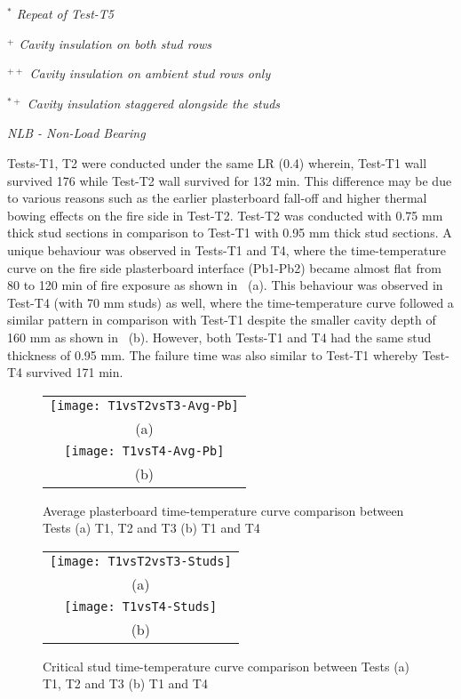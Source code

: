 \begin{sidewaystable}[!htbp]
\begin{threeparttable}
\begin{center}
\begin{tablenotes}
						\small
						\item \textit{\(^*\) Repeat of Test-T5}
						\item \textit{\(^+\) Cavity insulation on both stud rows}
						\item \textit{\(^{++}\) Cavity insulation on ambient stud rows only}
						\item \textit{\(^{*+}\) Cavity insulation staggered alongside the studs}
						\item \textit{NLB - Non-Load Bearing}
					\end{tablenotes}
		\end{center}
	\end{threeparttable}
\end{sidewaystable}%

Tests-T1, T2 were conducted under the same LR (0.4) wherein, Test-T1 wall survived 176 while Test-T2 wall survived for 132 min. This difference may be due to various reasons such as the earlier plasterboard fall-off and higher thermal bowing effects on the fire side in Test-T2. Test-T2 was conducted with 0.75 mm thick stud sections in comparison to Test-T1 with 0.95 mm thick stud sections. A unique behaviour was observed in Tests-T1 and T4, where the time-temperature curve on the fire side plasterboard interface (Pb1-Pb2) became almost flat from 80 to 120 min of fire exposure as shown in ~(a). This behaviour was observed in Test-T4 (with 70 mm studs) as well, where the time-temperature curve followed a similar pattern in comparison with Test-T1 despite the smaller cavity depth of 160 mm as shown in ~(b). However, both Tests-T1 and T4 had the same stud thickness of 0.95 mm. The failure time was also similar to Test-T1 whereby Test-T4 survived 171 min. 
\begin{figure}[!htbp]
	\centering
		\begin{tabular}{c}
			\texttt{[image: T1vsT2vsT3-Avg-Pb]} \\
			(a) \\
			 \texttt{[image: T1vsT4-Avg-Pb]} \\ 
			 (b) \\ 
		\end{tabular} 
		\caption{Average plasterboard time-temperature curve comparison between Tests (a) T1, T2 and T3 (b) T1 and T4}
		\label{fig:T1vsT2vsT3vsT4-Avg-Pb}
\end{figure}
\begin{figure}[!htbp]
	\centering
		\begin{tabular}{c}
			\texttt{[image: T1vsT2vsT3-Studs]} \\
			(a) \\ 
			\texttt{[image: T1vsT4-Studs]} \\ 
			(b) \\ 
		\end{tabular} 
		\caption{Critical stud time-temperature curve comparison between Tests (a) T1, T2 and T3 (b) T1 and T4}
		\label{fig:T1vsT2vsT3vsT4-Studs}
\end{figure}

